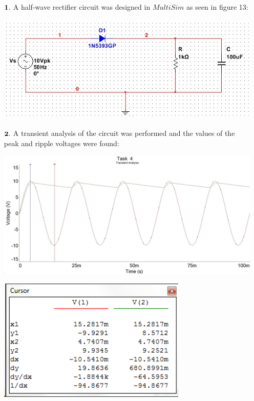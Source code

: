 \documentclass[11pt,a4paper]{article}
\begin{document}
\begin{enumerate}
  \item[$\bold{1.}$]
  A half-wave rectifier circuit was designed in $MultiSim$ as seen in figure 13:
  \\
  
	\begin{minipage}{\linewidth}
    	\centering
        \includegraphics[width=13cm]{4_1.jpg}
    \end{minipage}
    
  
  \item[$\bold{2.}$]
 	A transient analysis of the circuit was performed and the values of the peak and ripple voltages were found:
  \\
	\begin{minipage}{\linewidth}
    	\centering
        \includegraphics[width=13cm]{4_2.jpg}
    \end{minipage}

    \pagebreak
    
    
    \begin{minipage}{\linewidth}
    	\centering
        \includegraphics[width=9cm]{table_4_1.png}
    \end{minipage}
    

\end{enumerate}
\end{document}
